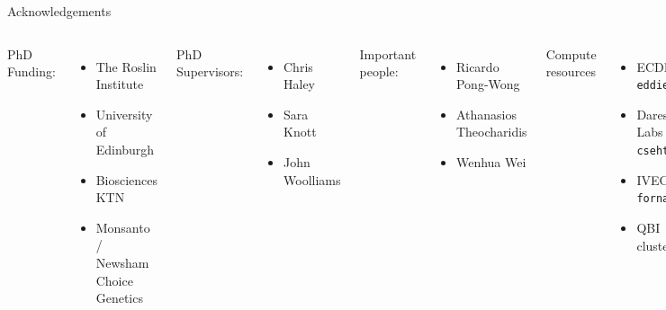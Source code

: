 \documentclass{beamer}
\begin{document}
\begin{frame}{Acknowledgements}


\begin{columns}[c]


{\tiny
PhD Funding:
\begin{itemize}
\item The Roslin Institute
\item University of Edinburgh
\item Biosciences KTN
\item Monsanto / Newsham Choice Genetics
\end{itemize}
PhD Supervisors:
\begin{itemize}
\item Chris Haley
\item Sara Knott
\item John Woolliams
\end{itemize}
Important people:
\begin{itemize}
\item Ricardo Pong-Wong
\item Athanasios Theocharidis
\item Wenhua Wei
\end{itemize}
Compute resources
\begin{itemize}
\item ECDF - {\tt eddie}
\item Daresbury Labs - {\tt cseht}
\item IVEC - {\tt fornax}
\item QBI cluster
\end{itemize}
}


{\tiny
Complex Trait Genomics Group

\begin{itemize}
\item Peter Visscher
\item Naomi Wray
\item Joseph Powell
\item Jian Yang
\item Allan Mcrae
\item Anita Goldinger
\item Hong Lee
\item Anna Vinkhuyzen
\item Guo-Bo Chen
\item Beben Benyamin
\item Zong Zhang
\item Enda Byrne
\item Marie-Jo Brion
\item Sven Stringer
\item Visit us at www.complextraitgenomics.com
\end{itemize}
}

\end{columns}
\end{frame}
\end{document}
